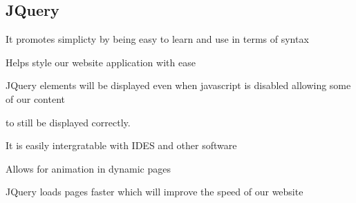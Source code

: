 \subsection{JQuery}
\item It promotes simplicty by being easy to learn and use in terms of syntax 
\item Helps style our website application with ease
\item JQuery elements will be displayed even when javascript is disabled allowing some of our content\item to still be displayed correctly.
\item It is easily intergratable with IDES and other software
\item Allows for animation in dynamic pages
\item JQuery loads pages faster which will improve the speed of our website

